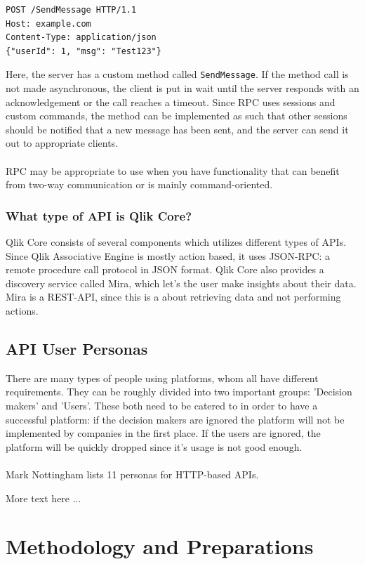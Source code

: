 \documentclass{article}
\begin{document}
\begin{lstlisting}
POST /SendMessage HTTP/1.1
Host: example.com
Content-Type: application/json
{"userId": 1, "msg": "Test123"}
\end{lstlisting}

Here, the server has a custom method called \texttt{SendMessage}. If the
method call is not made asynchronous, the client is put in wait until
the server responds with an acknowledgement or the call reaches a
timeout. Since RPC uses sessions and custom commands, the method can be
implemented as such that other sessions should be notified that a new
message has been sent, and the server can send it out to appropriate
clients.
\\ \\
RPC may be appropriate to use when you have functionality that can
benefit from two-way communication or is mainly command-oriented.

\subsubsection{What type of API is Qlik Core?}

Qlik Core consists of several components which utilizes different types
of APIs. Since Qlik Associative Engine is mostly action based, it uses
JSON-RPC: a remote procedure call protocol in JSON format. Qlik Core
also provides a discovery service called Mira, which let's the user make
insights about their data. Mira is a REST-API, since this is a about
retrieving data and not performing actions.\cite{qlikwebsite}

\subsection{API User Personas}
There are many types of people using platforms, whom all have different
requirements. They can be roughly divided into two important groups:
'Decision makers' and 'Users'. These both need to be catered to in order
to have a successful platform: if the decision makers are ignored the
platform will not be implemented by companies in the first place. If the
users are ignored, the platform will be quickly dropped since it's usage
is not good enough.
\\ \\
Mark Nottingham lists 11 personas for HTTP-based APIs\cite{personas}.

More text here ...

\section{Methodology and Preparations}
\end{document}
